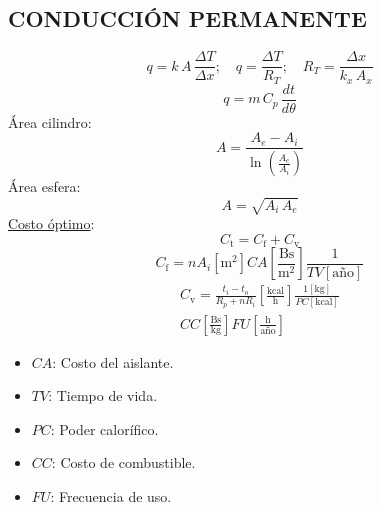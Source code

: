 \documentclass[letter,oneside,10pt]{article}
\begin{document}
\begin{multicols}{3}
\section*{CONDUCCIÓN PERMANENTE}
\vspace{-0.5cm}
\begin{equation*}
    q = k\,A\,\frac{\Delta T}{\Delta x};\quad
    q = \frac{\Delta T}{R_T};\quad
    R_T = \frac{\Delta x}{k_x\,A_x}
\end{equation*}
\vspace{-0.3cm}
\begin{equation*}
    q = m\,C_p\,\frac{dt}{d\theta}
\end{equation*}
\vspace{-0.2cm}
Área cilindro:
\vspace{-0.4cm}
\begin{equation*}
    A=\frac{A_e-A_i}{\ln\left(\frac{A_e}{A_i}\right)}
\end{equation*}
\vspace{-0.2cm}
Área esfera:
\vspace{-0.4cm}
\begin{equation*}
    A=\sqrt{A_i\,A_e}
\end{equation*}
\underline{Costo óptimo}:
\vspace{-0.3cm}
\begin{equation*}
    C_{\text{t}}=C_{\text{f}}+C_{\text{v}}
\end{equation*}
\begin{equation*}
    C_{\text{f}}=nA_i[\text{m}^2]
    CA\left[\frac{\text{Bs}}{\text{m}^2}\right]
    \frac{1}{TV[\text{año}]}
\end{equation*}
\begin{equation*}
    \begin{split}
        C_{\text{v}}=\frac{t_i-t_o}{R_p+nR_i}
        \left[\frac{\text{kcal}}{\text{h}}\right]
        \frac{1[\text{kg}]}{PC[\text{kcal}]}\\
        CC\left[\frac{\text{Bs}}{\text{kg}}\right]
        FU\left[\frac{\text{h}}{\text{año}}\right]
    \end{split}
\end{equation*}
\vspace{-0.3cm}
\tiny
\begin{itemize}
    \item $CA$: Costo del aislante.
    \item $TV$: Tiempo de vida.
    \item $PC$: Poder calorífico.
    \item $CC$: Costo de combustible.
    \item $FU$: Frecuencia de uso.
\end{itemize}


\end{multicols}
\end{document}
